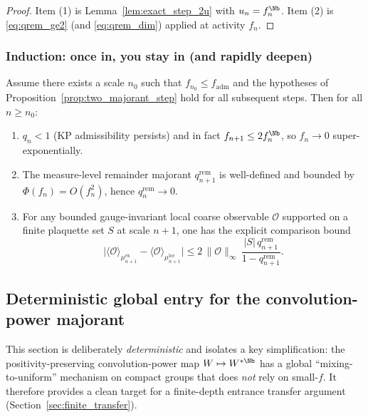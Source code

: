 \begin{proof}
Item (1) is Lemma~\ref{lem:exact_step_2u} with $u_n=f_n^{\Nb}$.
Item (2) is \eqref{eq:qrem_ge2} (and \eqref{eq:qrem_dim}) applied at activity $f_n$.
\end{proof}

\subsubsection{Induction: once in, you stay in (and rapidly deepen)}

\begin{corollary}\label{cor:two_majorant_induction}
Assume there exists a scale $n_0$ such that $f_{n_0}\le f_{\mathrm{adm}}$ and the hypotheses of Proposition~\ref{prop:two_majorant_step} hold for all subsequent steps.
Then for all $n\ge n_0$:
\begin{enumerate}[leftmargin=*]
\item $q_n<1$ (KP admissibility persists) and in fact $f_{n+1}\le 2 f_n^{\Nb}$, so $f_n\to 0$ super-exponentially.
\item The measure-level remainder majorant $q^{\mathrm{rem}}_{n+1}$ is well-defined and bounded by $\Phi(f_n)=O(f_n^2)$, hence $q^{\mathrm{rem}}_{n}\to 0$.
\item For any bounded gauge-invariant local coarse observable $\mathcal O$ supported on a finite plaquette set $S$ at scale $n+1$, one has the explicit comparison bound
\[
\bigl|\langle \mathcal O\rangle_{\mu^{\mathrm{ex}}_{n+1}}-\langle \mathcal O\rangle_{\mu^{\mathrm{loc}}_{n+1}}\bigr|
\le
2\,\|\mathcal O\|_{\infty}\,\frac{|S|\,q^{\mathrm{rem}}_{n+1}}{1-q^{\mathrm{rem}}_{n+1}}.
\]
\end{enumerate}
\end{corollary}




\subsection{Deterministic global entry for the convolution-power majorant}\label{sec:det_entry}

This section is deliberately \emph{deterministic} and isolates a key simplification:
the positivity-preserving convolution-power map $W\mapsto W^{*\Nb}$ has a
global ``mixing-to-uniform'' mechanism on compact groups that does \emph{not} rely on small-$f$.
It therefore provides a clean target for a finite-depth entrance transfer
argument (Section~\ref{sec:finite_transfer}).

